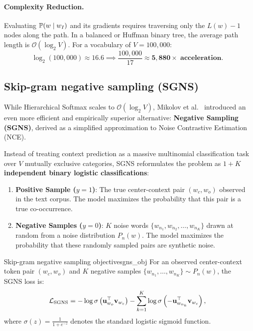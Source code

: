 \documentclass[../../main.tex]{subfiles}
\begin{document}
\paragraph{Complexity Reduction.}
Evaluating $\mathbb{P}(w \mid w_I)$ and its gradients requires traversing only the $L(w) - 1$ nodes along the path. In a balanced or Huffman binary tree, the average path length is $\mathcal{O}(\log_2 V)$. For a vocabulary of $V = 100{,}000$:
\begin{equation}
\label{eq:hierarchical_speedup}
\log_2(100{,}000) \approx 16.6 \implies \frac{100{,}000}{17} \approx \mathbf{5{,}880\times \text{ acceleration}}.
\end{equation}

\subsection{Skip-gram negative sampling (SGNS)}
\label{subsec:sgns_formulation}

While Hierarchical Softmax scales to $\mathcal{O}(\log_2 V)$, Mikolov et al.~\cite{mikolov2013distributed} introduced an even more efficient and empirically superior alternative: \textbf{Negative Sampling (SGNS)}, derived as a simplified approximation to Noise Contrastive Estimation (NCE).

Instead of treating context prediction as a massive multinomial classification task over $V$ mutually exclusive categories, SGNS reformulates the problem as \textbf{$1 + K$ independent binary logistic classifications}:
\begin{enumerate}
    \item \textbf{Positive Sample ($y = 1$)}: The true center-context pair $(w_c, w_o)$ observed in the text corpus. The model maximizes the probability that this pair is a true co-occurrence.
    \item \textbf{Negative Samples ($y = 0$)}: $K$ noise words $\{w_{n_1}, w_{n_2}, \dots, w_{n_K}\}$ drawn at random from a noise distribution $P_n(w)$. The model maximizes the probability that these randomly sampled pairs are synthetic noise.
\end{enumerate}

\begin{definition}{Skip-gram negative sampling objective}{sgns_obj}
For an observed center-context token pair $(w_c, w_o)$ and $K$ negative samples $\{w_{n_1}, \dots, w_{n_K}\} \sim P_n(w)$, the SGNS loss is:
\begin{equation}
\label{eq:sgns_loss_display}
\mathcal{L}_{\text{SGNS}} = -\log \sigma\left( \mathbf{u}_{w_o}^\top \mathbf{v}_{w_c} \right) - \sum_{k=1}^K \log \sigma\left( -\mathbf{u}_{w_{n_k}}^\top \mathbf{v}_{w_c} \right),
\end{equation}
where $\sigma(z) = \frac{1}{1 + e^{-z}}$ denotes the standard logistic sigmoid function.
\end{definition}
\end{document}
